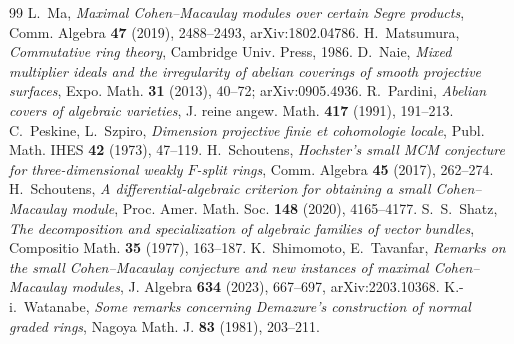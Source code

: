 \documentclass[11pt]{amsart}
\theoremstyle{remark}
\theoremstyle{definition}
\begin{document}
\begin{thebibliography}{99}
 L.~Ma, \emph{Maximal Cohen--Macaulay modules over certain Segre products}, Comm. Algebra \textbf{47} (2019), 2488--2493, arXiv:1802.04786.
 H.~Matsumura, \emph{Commutative ring theory}, Cambridge Univ. Press, 1986.
 D.~Naie, \emph{Mixed multiplier ideals and the irregularity of abelian coverings of smooth projective surfaces}, Expo. Math. \textbf{31} (2013), 40--72; arXiv:0905.4936.
 R.~Pardini, \emph{Abelian covers of algebraic varieties}, J. reine angew. Math. \textbf{417} (1991), 191--213.
 C.~Peskine, L.~Szpiro, \emph{Dimension projective finie et cohomologie locale}, Publ. Math. IHES \textbf{42} (1973), 47--119.
 H.~Schoutens, \emph{Hochster's small MCM conjecture for three-dimensional weakly $F$-split rings}, Comm. Algebra \textbf{45} (2017), 262--274.
 H.~Schoutens, \emph{A differential-algebraic criterion for obtaining a small Cohen--Macaulay module}, Proc. Amer. Math. Soc. \textbf{148} (2020), 4165--4177.
 S.~S.~Shatz, \emph{The decomposition and specialization of algebraic families of vector bundles}, Compositio Math. \textbf{35} (1977), 163--187.
 K.~Shimomoto, E.~Tavanfar, \emph{Remarks on the small Cohen--Macaulay conjecture and new instances of maximal Cohen--Macaulay modules}, J. Algebra \textbf{634} (2023), 667--697, arXiv:2203.10368.
 K.-i.~Watanabe, \emph{Some remarks concerning Demazure's construction of normal graded rings}, Nagoya Math. J. \textbf{83} (1981), 203--211.
\end{thebibliography}
\end{document}
